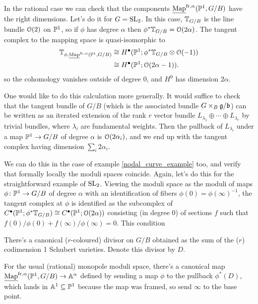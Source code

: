 \documentclass[10pt, oneside, a4paper]{article}
\newcommand{\map}{\ul{\mr{Map}}}
\begin{document}
\begin{remark}
In the rational case we can check that the components $\map^{\mr{fr},\alpha}(\bb P^1, G/B)$ have the right dimensions.  Let's do it for $G = \mathrm{SL}_2$.  In this case, $\mathbb{T}_{G/B}$ is the line bundle $\mathcal{O}(2)$ on $\mathbb{P}^1$, so if $\phi$ has degree $\alpha$ then $\phi^*\mathbb{T}_{G/B} = \mathcal{O}(2\alpha)$.  The tangent complex to the mapping space is quasi-isomorphic to 
\begin{align*}
\bb T_{\phi, \map^{\mr{fr},\alpha}(\bb P^1, G/B)} &\iso H^\bullet(\bb P^1; \phi^*\bb T_{G/B} \otimes \OO(-1)) \\
&\iso H^\bullet(\bb P^1; \OO(2\alpha-1)).
\end{align*}
so the cohomology vanishes outside of degree 0, and $H^0$ has dimension $2\alpha$.

One would like to do this calculation more generally.  It would suffice to check that the tangent bundle of $G/B$ (which is the associated bundle $G \times_B \mathfrak{g}/\mathfrak{b}$) can be written as an iterated extension of the rank $r$ vector bundle $L_{\lambda_1} \oplus \cdots \oplus L_{\lambda_r}$ by trivial bundles, where $\lambda_i$ are fundamental weights.  Then the pullback of $L_{\lambda_i}$ under a map $\mathbb{P}^1 \to G/B$ of degree $\alpha$ is $\mathcal{O}(2\alpha_i)$, and we end up with the tangent complex having dimension $\sum_i 2\alpha_i$.

We can do this in the case of example \ref{nodal_curve_example} too, and verify that formally locally the moduli spaces coincide.  Again, let's do this for the straightforward example of $\mathrm{SL}_2$.  Viewing the moduli space as the moduli of maps $\phi \colon \mathbb{P}^1 \to G/B$ of degree $\alpha$ with an identification of fibers $\phi(0) = \phi(\infty)^{-1}$, the tangent complex at $\phi$ is identified as the subcomplex of $C^\bullet(\mathbb{P}^1; \phi^*\mathbb{T}_{G/B}) \cong C^\bullet(\mathbb{P}^1; \mathcal{O}(2\alpha))$ consisting (in degree 0) of sections $f$ such that $f(0)/\phi(0) + f(\infty)/\phi(\infty) = 0$.  This condition
\end{remark}


There's a canonical ($r$-coloured) divisor on $G/B$ obtained as the sum of the ($r$) codimension 1 Schubert varieties.  Denote this divisor by $D$. 

\begin{example}
For the usual (rational) monopole moduli space, there's a canonical map $\map^{\mr{fr},\alpha}(\bb P^1, G/B) \to \bb A^{\alpha}$ defined by sending a map $\phi$ to the pullback $\phi^*(D)$, which lands in $\mathbb{A}^1 \subseteq \mathbb{P}^1$ because the map was framed, so send $\infty$ to the base point.
\end{example}
\end{document}
